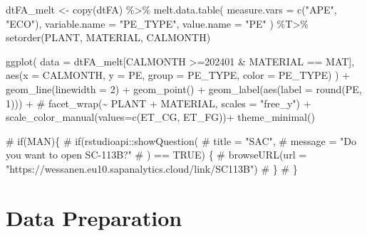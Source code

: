 \documentclass[
  american,
  10,
  a4paper,
]{book}
\newenvironment{Shaded}{\begin{snugshade}}{\end{snugshade}}
\newcommand{\AttributeTok}[1]{\textcolor[rgb]{0.40,0.45,0.13}{#1}}
\newcommand{\CommentTok}[1]{\textcolor[rgb]{0.37,0.37,0.37}{#1}}
\newcommand{\DecValTok}[1]{\textcolor[rgb]{0.68,0.00,0.00}{#1}}
\newcommand{\FunctionTok}[1]{\textcolor[rgb]{0.28,0.35,0.67}{#1}}
\newcommand{\NormalTok}[1]{\textcolor[rgb]{0.00,0.23,0.31}{#1}}
\newcommand{\OtherTok}[1]{\textcolor[rgb]{0.00,0.23,0.31}{#1}}
\newcommand{\SpecialCharTok}[1]{\textcolor[rgb]{0.37,0.37,0.37}{#1}}
\newcommand{\StringTok}[1]{\textcolor[rgb]{0.13,0.47,0.30}{#1}}
\theoremstyle{definition}
\theoremstyle{remark}
\begin{document}
\begin{Shaded}
\begin{Highlighting}[]
\NormalTok{dtFA\_melt  }\OtherTok{\textless{}{-}} 
  \FunctionTok{copy}\NormalTok{(dtFA) }\SpecialCharTok{\%\textgreater{}\%}
  \FunctionTok{melt.data.table}\NormalTok{(}
    \AttributeTok{measure.vars  =} \FunctionTok{c}\NormalTok{(}\StringTok{"APE"}\NormalTok{, }\StringTok{"ECO"}\NormalTok{),}
    \AttributeTok{variable.name =} \StringTok{"PE\_TYPE"}\NormalTok{,}
    \AttributeTok{value.name    =} \StringTok{"PE"}
\NormalTok{    )                                         }\SpecialCharTok{\%T\textgreater{}\%} 
  \FunctionTok{setorder}\NormalTok{(PLANT, MATERIAL, CALMONTH)}

\FunctionTok{ggplot}\NormalTok{(}
  \AttributeTok{data =}\NormalTok{ dtFA\_melt[CALMONTH }\SpecialCharTok{\textgreater{}=}\StringTok{\textquotesingle{}202401\textquotesingle{}} \SpecialCharTok{\&}\NormalTok{ MATERIAL }\SpecialCharTok{==}\NormalTok{ MAT], }
  \FunctionTok{aes}\NormalTok{(}\AttributeTok{x =}\NormalTok{ CALMONTH, }\AttributeTok{y =}\NormalTok{ PE, }\AttributeTok{group =}\NormalTok{ PE\_TYPE, }\AttributeTok{color =}\NormalTok{ PE\_TYPE)}
\NormalTok{  ) }\SpecialCharTok{+}
  \FunctionTok{geom\_line}\NormalTok{(}\AttributeTok{linewidth =} \DecValTok{2}\NormalTok{) }\SpecialCharTok{+}
  \FunctionTok{geom\_point}\NormalTok{() }\SpecialCharTok{+}
  \FunctionTok{geom\_label}\NormalTok{(}\FunctionTok{aes}\NormalTok{(}\AttributeTok{label =} \FunctionTok{round}\NormalTok{(PE, }\DecValTok{1}\NormalTok{))) }\SpecialCharTok{+}
  \CommentTok{\# facet\_wrap(\textasciitilde{} PLANT + MATERIAL, scales = "free\_y") +}
  \FunctionTok{scale\_color\_manual}\NormalTok{(}\AttributeTok{values=}\FunctionTok{c}\NormalTok{(ET\_CG, ET\_FG))}\SpecialCharTok{+}
  \FunctionTok{theme\_minimal}\NormalTok{()}

\CommentTok{\# if(MAN)\{}
\CommentTok{\#   if(rstudioapi::showQuestion(}
\CommentTok{\#     title   = "SAC", }
\CommentTok{\#     message = "Do you want to open SC{-}113B?"}
\CommentTok{\#   ) == TRUE) \{}
\CommentTok{\#     browseURL(url = "https://wessanen.eu10.sapanalytics.cloud/link/SC113B")}
\CommentTok{\#   \}}
\CommentTok{\# \}}
\end{Highlighting}
\end{Shaded}

\chapter{Data Preparation}\label{data-preparation-1}
\end{document}
